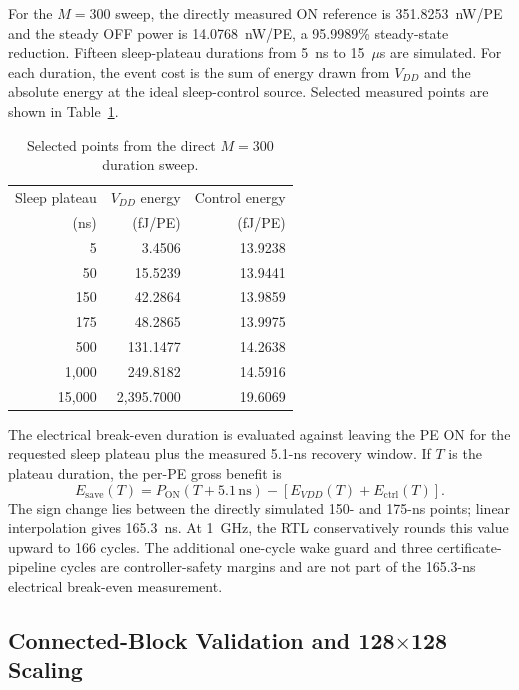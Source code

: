 For the $M=300$ sweep, the directly measured ON reference is
351.8253~nW/PE and the steady OFF power is 14.0768~nW/PE, a 95.9989\%
steady-state reduction.  Fifteen sleep-plateau durations from 5~ns to
15~$\mu$s are simulated.  For each duration, the event cost is the sum of
energy drawn from $V_{DD}$ and the absolute energy at the ideal sleep-control
source.  Selected measured points are shown in
Table~\ref{tab:m300-duration-sweep}.

\begin{table}[t]
  \centering
  \caption{Selected points from the direct $M=300$ duration sweep.}
  \label{tab:m300-duration-sweep}
  \begin{tabular}{rrr}
    \toprule
    Sleep plateau & $V_{DD}$ energy & Control energy \\
    (ns) & (fJ/PE) & (fJ/PE) \\
    \midrule
       5 &   3.4506 & 13.9238 \\
      50 &  15.5239 & 13.9441 \\
     150 &  42.2864 & 13.9859 \\
     175 &  48.2865 & 13.9975 \\
     500 & 131.1477 & 14.2638 \\
    1,000 & 249.8182 & 14.5916 \\
   15,000 & 2,395.7000 & 19.6069 \\
    \bottomrule
  \end{tabular}
\end{table}

The electrical break-even duration is evaluated against leaving the PE ON
for the requested sleep plateau plus the measured 5.1-ns recovery window.  If
$T$ is the plateau duration, the per-PE gross benefit is
\begin{equation}
  E_{\mathrm{save}}(T)=P_{\mathrm{ON}}(T+5.1\,\mathrm{ns})
  -\left[E_{VDD}(T)+E_{\mathrm{ctrl}}(T)\right].
  \label{eq:hspice-break-even}
\end{equation}
The sign change lies between the directly simulated 150- and 175-ns points;
linear interpolation gives 165.3~ns.  At 1~GHz, the RTL conservatively rounds
this value upward to 166 cycles.  The additional one-cycle wake guard and
three certificate-pipeline cycles are controller-safety margins and are not
part of the 165.3-ns electrical break-even measurement.

\subsection{Connected-Block Validation and 128$\times$128 Scaling}
\label{sec:sa-scaling}

